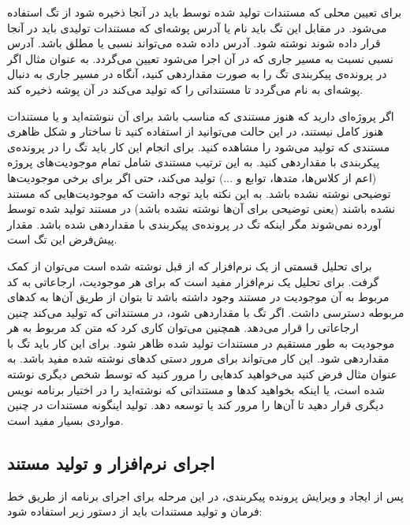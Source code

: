 برای تعیین محلی که مستندات تولید شده توسط  باید در آنجا ذخیره شود از
تگ  استفاده می‌شود. در مقابل این تگ باید نام یا آدرس
پوشه‌ای که مستندات تولیدی باید در آنجا قرار داده شوند نوشته شود.
آدرس داده شده می‌تواند نسبی یا مطلق باشد. آدرس نسبی نسبت به مسیر جاری که
 در آن اجرا می‌شود تعیین می‌گردد.
به عنوان مثال اگر در پرونده‌ی پیکربندی تگ  را به صورت
 مقداردهی کنید، آنگاه  در مسیر جاری
به دنبال پوشه‌ای به نام  می‌گردد تا مستنداتی را که تولید می‌کند در آن
پوشه ذخیره کند.


اگر  پروژه‌ای دارید که هنوز مستندی که مناسب  باشد برای آن ننوشته‌اید
و یا مستندات هنوز کامل نیستند، در این حالت می‌توانید از  استفاده
کنید تا ساختار و شکل ظاهری مستندی که تولید می‌شود را مشاهده کنید. برای انجام این
کار باید تگ  را در پرونده‌ی پیکربندی با  مقداردهی کنید.
به این ترتیب  مستندی شامل تمام موجودیت‌های پروژه (اعم از کلاس‌ها،
متدها، توابع و ...) تولید می‌کند، حتی اگر برای برخی موجودیت‌ها توضیحی نوشته نشده
باشد. به این نکته باید توجه داشت که موجودیت‌هایی که مستند نشده باشند (یعنی
توضیحی برای آن‌ها نوشته نشده باشد) در مستند تولید شده توسط  آورده
نمی‌شوند مگر اینکه تگ  در پرونده‌ی پیکربندی با 
مقداردهی شده باشد. مقدار پیش‌فرض این تگ  است.

برای تحلیل قسمتی از یک نرم‌افزار که از قبل نوشته شده است می‌توان از 
کمک گرفت. برای تحلیل یک نرم‌افزار مفید است که برای هر موجودیت، ارجاعاتی به کد
مربوط به آن موجودیت در مستند وجود داشته باشد تا بتوان از طریق آن‌ها به کدهای
مربوطه دسترسی داشت. اگر تگ  با  مقداردهی شود،
 در مستنداتی که تولید می‌کند چنین ارجاعاتی را قرار می‌دهد. همچنین
می‌توان کاری کرد که متن کد مربوط به هر موجودیت به طور مستقیم در مستندات تولید
شده ظاهر شود. برای این کار باید تگ  با  مقداردهی
شود. این کار می‌تواند برای مرور دستی کدهای نوشته شده مفید باشد. به عنوان مثال
فرض کنید می‌خواهید کدهایی را مرور کنید که توسط شخص دیگری نوشته شده است، یا اینکه
بخواهید کدها و مستنداتی که نوشته‌اید را در اختیار برنامه نویس دیگری قرار دهید تا
آن‌ها را مرور کند یا توسعه دهد. تولید اینگونه مستندات در چنین مواردی بسیار مفید
است.

\subsection{اجرای نرم‌افزار  و تولید مستند}

پس از ایجاد و ویرایش پرونده پیکربندی، در این مرحله برای اجرای برنامه
 از طریق خط فرمان و تولید مستندات باید از دستور زیر استفاده شود:

